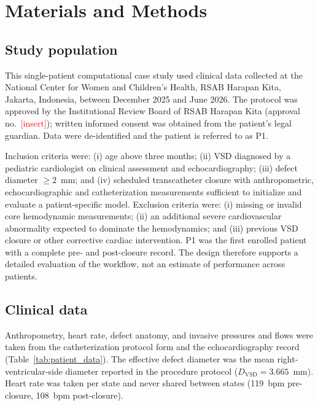
\section{Materials and Methods}
\label{sec:methods}

\subsection{Study population}
\label{sec:study_population}
This single-patient computational case study used clinical data collected at the National Center for Women and Children's Health, RSAB Harapan Kita, Jakarta, Indonesia, between December 2025 and June 2026. The protocol was approved by the Institutional Review Board of RSAB Harapan Kita (approval no.\ \textcolor{red}{[insert]}); written informed consent was obtained from the patient's legal guardian. Data were de-identified and the patient is referred to as P1.

Inclusion criteria were: (i) age above three months; (ii) VSD diagnosed by a pediatric cardiologist on clinical assessment and echocardiography; (iii) defect diameter $\ge 2$~mm; and (iv) scheduled transcatheter closure with anthropometric, echocardiographic and catheterization measurements sufficient to initialize and evaluate a patient-specific model. Exclusion criteria were: (i) missing or invalid core hemodynamic measurements; (ii) an additional severe cardiovascular abnormality expected to dominate the hemodynamics; and (iii) previous VSD closure or other corrective cardiac intervention. P1 was the first enrolled patient with a complete pre- and post-closure record. The design therefore supports a detailed evaluation of the workflow, not an estimate of performance across patients.

\subsection{Clinical data}
\label{sec:data}
Anthropometry, heart rate, defect anatomy, and invasive pressures and flows were taken from the catheterization protocol form and the echocardiography record (Table~\ref{tab:patient_data}). The effective defect diameter was the mean right-ventricular-side diameter reported in the procedure protocol ($D_{\mathrm{VSD}} = 3.665$~mm). Heart rate was taken per state and never shared between states (119~bpm pre-closure, 108~bpm post-closure).

